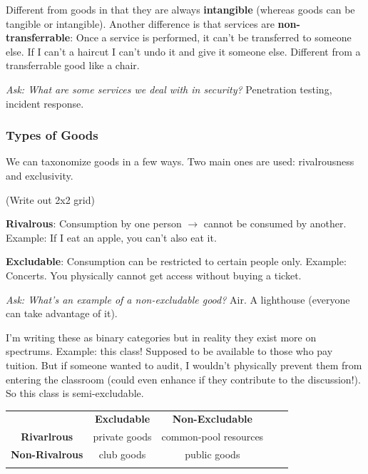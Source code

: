 \documentclass[11pt]{article}
\begin{document}
Different from goods in that they are always {\bf intangible} (whereas goods can be tangible or intangible). 
Another difference is that services are {\bf non-transferrable}: Once a service is performed, it can't be transferred to someone else. 
If I can't a haircut I can't undo it and give it someone else.
Different from a transferrable good like a chair.

{\it Ask: What are some services we deal with in security?} Penetration testing, incident response. 

\subsubsection{Types of Goods}

We can taxonomize goods in a few ways.
Two main ones are used: rivalrousness and exclusivity.

(Write out 2x2 grid)

{\bf Rivalrous}: Consumption by one person $\rightarrow$ cannot be consumed by another.
Example: If I eat an apple, you can't also eat it.  

{\bf Excludable}: Consumption can be restricted to certain people only. 
Example: Concerts. You physically cannot get access without buying a ticket.

{\it Ask: What's an example of a non-excludable good?} Air. A lighthouse (everyone can take advantage of it).

I'm writing these as binary categories but in reality they exist more on spectrums.
Example: this class! Supposed to be available to those who pay tuition. But if someone wanted to audit, I wouldn't physically prevent them from entering the classroom (could even enhance if they contribute to the discussion!). So this class is semi-excludable.


\begin{table}[]
    \centering
    \begin{tabular}{lccll}
    \cline{1-3}
    \multicolumn{1}{|l|}{\cellcolor[HTML]{EFEFEF}}                       & \multicolumn{1}{c|}{\cellcolor[HTML]{EFEFEF}\textbf{Excludable}} & \multicolumn{1}{c|}{\cellcolor[HTML]{EFEFEF}\textbf{Non-Excludable}} &  &  \\ \cline{1-3}
    \multicolumn{1}{|c|}{\cellcolor[HTML]{EFEFEF}\textbf{Rivarlrous}}    & \multicolumn{1}{c|}{private goods}                               & \multicolumn{1}{c|}{common-pool resources}                           &  &  \\ \cline{1-3}
    \multicolumn{1}{|c|}{\cellcolor[HTML]{EFEFEF}\textbf{Non-Rivalrous}} & \multicolumn{1}{c|}{club goods}                                  & \multicolumn{1}{c|}{public goods}                                    &  &  \\ \cline{1-3}
                                                                            & \multicolumn{1}{l}{}                                             & \multicolumn{1}{l}{}                                                 &  & 
    \end{tabular}
\end{table}
\end{document}
